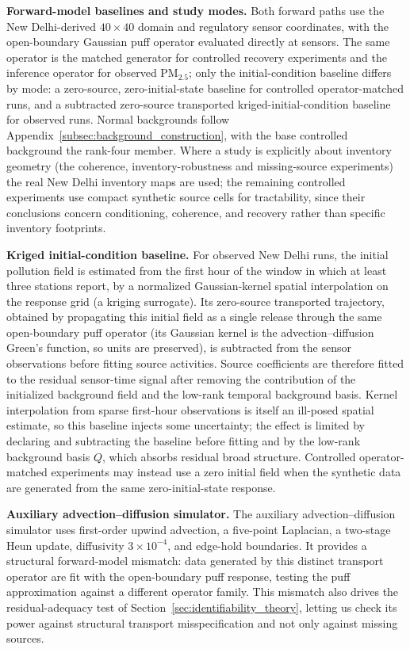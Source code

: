 \noindent\textbf{Forward-model baselines and study modes.}
Both forward paths use the New Delhi-derived \(40\times40\) domain and regulatory
sensor coordinates, with the open-boundary Gaussian puff operator evaluated
directly at sensors.  The same operator is the matched generator for controlled
recovery experiments and the inference operator for observed PM\(_{2.5}\); only the
initial-condition baseline differs by mode: a zero-source, zero-initial-state
baseline for controlled operator-matched runs, and a subtracted zero-source
transported kriged-initial-condition baseline for observed runs.  Normal
backgrounds follow Appendix~\ref{subsec:background_construction}, with the base
controlled background the rank-four member.  Where a study is explicitly about
inventory geometry (the coherence, inventory-robustness and missing-source experiments) the real
New Delhi inventory maps are used; the remaining controlled experiments use compact
synthetic source cells for tractability, since their conclusions concern
conditioning, coherence, and recovery rather than specific inventory footprints.

\noindent\textbf{Kriged initial-condition baseline.}
For observed New Delhi runs, the initial pollution field is estimated from the
first hour of the window in which at least three stations report, by a
normalized Gaussian-kernel spatial interpolation on the response grid (a kriging
surrogate).  Its
zero-source transported trajectory, obtained by propagating this initial field as
a single release through the same open-boundary puff operator (its Gaussian kernel
is the advection--diffusion Green's function, so units are preserved), is
subtracted from the sensor observations before fitting source activities.  Source
coefficients are therefore fitted to the residual sensor-time signal after
removing the contribution of the initialized background field and the low-rank
temporal background basis.  Kernel interpolation from sparse first-hour
observations is itself an ill-posed spatial estimate, so this baseline injects
some uncertainty; the effect is limited by declaring and subtracting the baseline
before fitting and by the low-rank background basis \(Q\), which absorbs residual
broad structure.  Controlled operator-matched experiments may instead use a zero
initial field when the synthetic data are generated from the same
zero-initial-state response.

\noindent\textbf{Auxiliary advection--diffusion simulator.}
The auxiliary advection--diffusion simulator uses first-order upwind advection, a
five-point Laplacian, a two-stage Heun update, diffusivity \(3\times10^{-4}\), and
edge-hold boundaries.  It provides a structural forward-model mismatch: data
generated by this distinct transport operator are fit with the open-boundary puff
response, testing the puff approximation against a different operator family.
This mismatch also drives the residual-adequacy test of
Section~\ref{sec:identifiability_theory}, letting us check its power against structural
transport misspecification and not only against missing sources.


